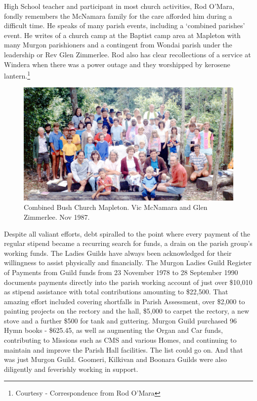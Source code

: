 High School teacher and participant in most church activities, Rod O'Mara, fondly remembers the McNamara family for the care afforded him during a difficult time. He speaks of many parish events, including a `combined parishes' event. He writes of a church camp at the Baptist camp area at Mapleton with many Murgon parishioners and a contingent from Wondai parish under the leadership or Rev Glen Zimmerlee. Rod also has clear recollections of a service at Windera when there was a power outage and they worshipped by kerosene lantern.\footnote{Courtesy - Correspondence from Rod O'Mara}








\begin{figure}[!htb]
\begin{center}
\includegraphics[width=1.\textwidth,center]{../images/bushChuchMapleton1987.jpg}
\caption{Combined Bush Church Mapleton. Vic McNamara and Glen Zimmerlee. Nov 1987.}
\end{center}
\end{figure}




Despite all valiant efforts, debt spiralled to the point where every payment of the regular stipend became a recurring search for funds, a drain on the parish group's working funds. The Ladies Guilds have always been acknowledged for their willingness to assist physically and financially. The Murgon Ladies Guild Register of Payments from Guild funds from 23 November 1978 to 28 September 1990 documents payments directly into the parish working account of just over \$10,010 as stipend assistance with total contributions amounting to \$22,500. That amazing effort included covering shortfalls in Parish Assessment, over \$2,000 to painting projects on the rectory and the hall, \$5,000 to carpet the rectory, a new stove and a further \$500 for tank and guttering. Murgon Guild purchased 96 Hymn books - \$625.45, as well as augmenting the Organ and Car funds, contributing to Missions such as CMS and various Homes, and continuing to maintain and improve the Parish Hall facilities. The list could go on. And that was just Murgon Guild. Goomeri, Kilkivan and Boonara Guilds were also diligently and feverishly working in support.



